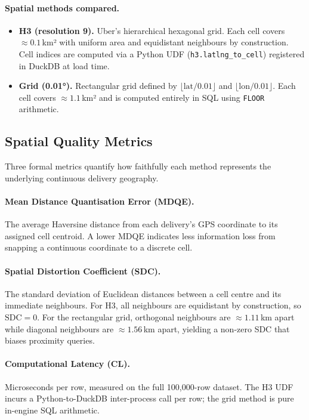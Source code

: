 \paragraph{Spatial methods compared.}
\begin{itemize}
  \item \textbf{H3 (resolution 9).} Uber's hierarchical hexagonal grid.
        Each cell covers ${\approx}0.1$\,km² with uniform area and
        equidistant neighbours by construction.
        Cell indices are computed via a Python UDF (\texttt{h3.latlng\_to\_cell})
        registered in DuckDB at load time.
  \item \textbf{Grid (0.01°).} Rectangular grid defined by
        $\lfloor\mathrm{lat}/0.01\rfloor$ and
        $\lfloor\mathrm{lon}/0.01\rfloor$.
        Each cell covers ${\approx}1.1$\,km² and is computed entirely in SQL
        using \texttt{FLOOR} arithmetic.
\end{itemize}


\subsection{Spatial Quality Metrics}

Three formal metrics quantify how faithfully each method represents the
underlying continuous delivery geography.

\paragraph{Mean Distance Quantisation Error (MDQE).}
The average Haversine distance from each delivery's GPS coordinate to its
assigned cell centroid.
A lower MDQE indicates less information loss from snapping a continuous
coordinate to a discrete cell.

\paragraph{Spatial Distortion Coefficient (SDC).}
The standard deviation of Euclidean distances between a cell centre and its
immediate neighbours.
For H3, all neighbours are equidistant by construction, so $\text{SDC} = 0$.
For the rectangular grid, orthogonal neighbours are ${\approx}1.11$\,km apart
while diagonal neighbours are ${\approx}1.56$\,km apart, yielding a non-zero
SDC that biases proximity queries.

\paragraph{Computational Latency (CL).}
Microseconds per row, measured on the full 100{,}000-row dataset.
The H3 UDF incurs a Python-to-DuckDB inter-process call per row; the grid
method is pure in-engine SQL arithmetic.

